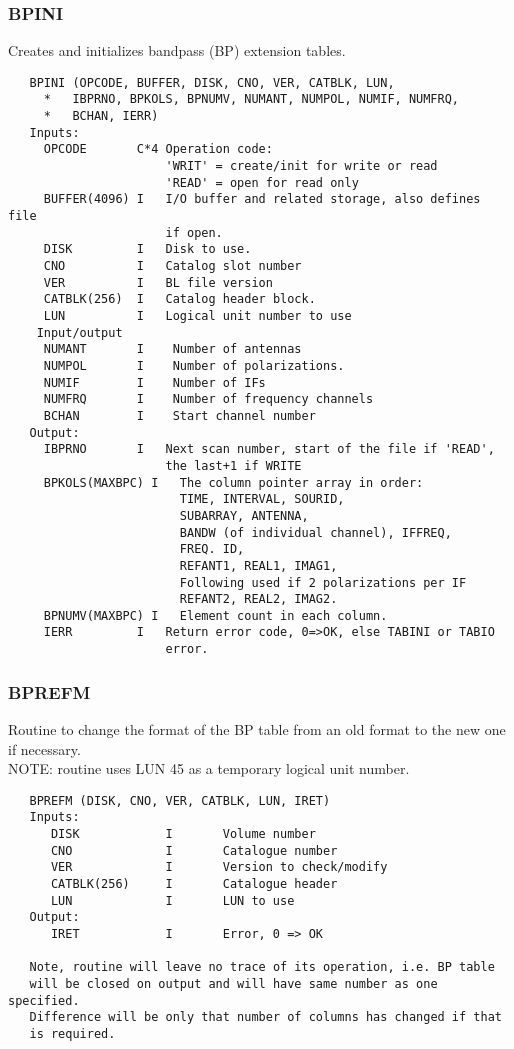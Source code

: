 \subsubsection{BPINI}
Creates and initializes bandpass (BP) extension tables.
\begin{verbatim}
   BPINI (OPCODE, BUFFER, DISK, CNO, VER, CATBLK, LUN,
     *   IBPRNO, BPKOLS, BPNUMV, NUMANT, NUMPOL, NUMIF, NUMFRQ,
     *   BCHAN, IERR)
   Inputs:
     OPCODE       C*4 Operation code:
                      'WRIT' = create/init for write or read
                      'READ' = open for read only
     BUFFER(4096) I   I/O buffer and related storage, also defines file
                      if open.
     DISK         I   Disk to use.
     CNO          I   Catalog slot number
     VER          I   BL file version
     CATBLK(256)  I   Catalog header block.
     LUN          I   Logical unit number to use
    Input/output
     NUMANT       I    Number of antennas
     NUMPOL       I    Number of polarizations.
     NUMIF        I    Number of IFs
     NUMFRQ       I    Number of frequency channels
     BCHAN        I    Start channel number
   Output:
     IBPRNO       I   Next scan number, start of the file if 'READ',
                      the last+1 if WRITE
     BPKOLS(MAXBPC) I   The column pointer array in order:
                        TIME, INTERVAL, SOURID,
                        SUBARRAY, ANTENNA,
                        BANDW (of individual channel), IFFREQ,
                        FREQ. ID,
                        REFANT1, REAL1, IMAG1,
                        Following used if 2 polarizations per IF
                        REFANT2, REAL2, IMAG2.
     BPNUMV(MAXBPC) I   Element count in each column.
     IERR         I   Return error code, 0=>OK, else TABINI or TABIO
                      error.
\end{verbatim}

\subsubsection{BPREFM}
Routine to change the format of the BP table from an old format to the
new one if necessary.\\
NOTE: routine uses LUN 45 as a temporary logical unit number.
\begin{verbatim}
   BPREFM (DISK, CNO, VER, CATBLK, LUN, IRET)
   Inputs:
      DISK            I       Volume number
      CNO             I       Catalogue number
      VER             I       Version to check/modify
      CATBLK(256)     I       Catalogue header
      LUN             I       LUN to use
   Output:
      IRET            I       Error, 0 => OK

   Note, routine will leave no trace of its operation, i.e. BP table
   will be closed on output and will have same number as one specified.
   Difference will be only that number of columns has changed if that
   is required.
\end{verbatim}

